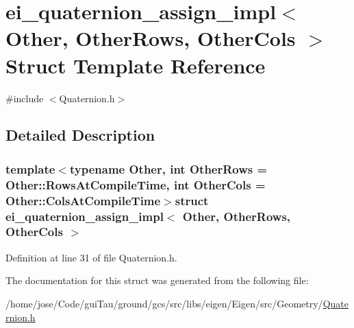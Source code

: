 \hypertarget{structei__quaternion__assign__impl}{\section{ei\-\_\-quaternion\-\_\-assign\-\_\-impl$<$ Other, Other\-Rows, Other\-Cols $>$ Struct Template Reference}
\label{structei__quaternion__assign__impl}
}


{\ttfamily \#include $<$Quaternion.\-h$>$}



\subsection{Detailed Description}
\subsubsection*{template$<$typename Other, int Other\-Rows = Other\-::\-Rows\-At\-Compile\-Time, int Other\-Cols = Other\-::\-Cols\-At\-Compile\-Time$>$struct ei\-\_\-quaternion\-\_\-assign\-\_\-impl$<$ Other, Other\-Rows, Other\-Cols $>$}



Definition at line 31 of file Quaternion.\-h.



The documentation for this struct was generated from the following file\-:\begin{DoxyCompactItemize}
\item 
/home/jose/\-Code/gui\-Tau/ground/gcs/src/libs/eigen/\-Eigen/src/\-Geometry/\hyperlink{_quaternion_8h}{Quaternion.\-h}\end{DoxyCompactItemize}
